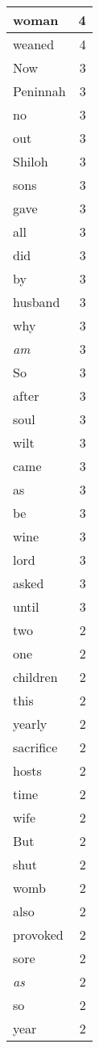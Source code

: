 \begin{center}
\begin{longtable}{l|r}
woman & 4 \\ \hline
weaned & 4 \\ \hline
Now & 3 \\ \hline
Peninnah & 3 \\ \hline
no & 3 \\ \hline
out & 3 \\ \hline
Shiloh & 3 \\ \hline
sons & 3 \\ \hline
gave & 3 \\ \hline
all & 3 \\ \hline
did & 3 \\ \hline
by & 3 \\ \hline
husband & 3 \\ \hline
why & 3 \\ \hline
\emph{am} & 3 \\ \hline
So & 3 \\ \hline
after & 3 \\ \hline
soul & 3 \\ \hline
wilt & 3 \\ \hline
came & 3 \\ \hline
as & 3 \\ \hline
be & 3 \\ \hline
wine & 3 \\ \hline
lord & 3 \\ \hline
asked & 3 \\ \hline
until & 3 \\ \hline
two & 2 \\ \hline
one & 2 \\ \hline
children & 2 \\ \hline
this & 2 \\ \hline
yearly & 2 \\ \hline
sacrifice & 2 \\ \hline
hosts & 2 \\ \hline
time & 2 \\ \hline
wife & 2 \\ \hline
But & 2 \\ \hline
shut & 2 \\ \hline
womb & 2 \\ \hline
also & 2 \\ \hline
provoked & 2 \\ \hline
sore & 2 \\ \hline
\emph{as} & 2 \\ \hline
so & 2 \\ \hline
year & 2 \\ \hline

\end{longtable}
\end{center}
